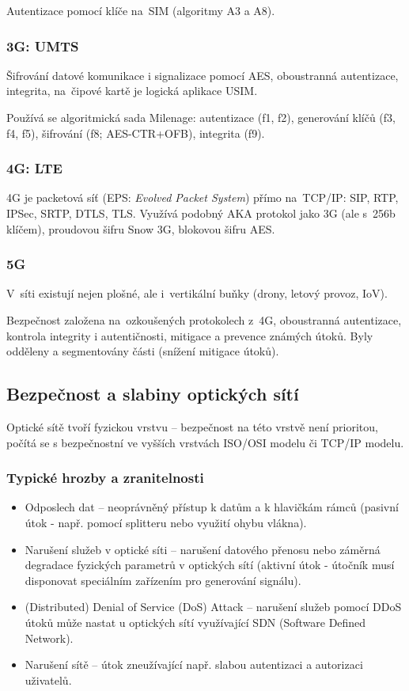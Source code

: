 Autentizace pomocí klíče na~SIM (algoritmy A3 a A8).


\subsubsection{3G: UMTS}

Šifrování datové komunikace i signalizace pomocí AES, oboustranná autentizace, integrita, na~čipové kartě je logická aplikace USIM.

Používá se algoritmická sada Milenage: autentizace (f1, f2), generování klíčů (f3, f4, f5), šifrování (f8; AES-CTR+OFB), integrita (f9).


\subsubsection{4G: LTE}

4G je packetová síť (EPS: \emph{Evolved Packet System}) přímo na~TCP/IP: SIP, RTP, IPSec, SRTP, DTLS, TLS.
Využívá podobný AKA protokol jako 3G (ale s~256b klíčem), proudovou šifru Snow 3G, blokovou šifru AES.


\subsubsection{5G}

V~síti existují nejen plošné, ale i~vertikální buňky (drony, letový provoz, IoV).

Bezpečnost založena na~ozkoušených protokolech z~4G, oboustranná autentizace, kontrola integrity i autentičnosti, mitigace a prevence známých útoků.
Byly odděleny a segmentovány části (snížení mitigace útoků).

\subsection{Bezpečnost a slabiny optických sítí}

Optické sítě tvoří fyzickou vrstvu – bezpečnost na této vrstvě není prioritou, počítá se s bezpečnostní ve vyšších vrstvách ISO/OSI modelu či TCP/IP modelu. 

\subsubsection{Typické hrozby a zranitelnosti}
\begin{itemize}
    \item Odposlech dat – neoprávněný přístup k datům a k hlavičkám rámců (pasivní útok - např. pomocí splitteru nebo využití ohybu vlákna).
    \item Narušení služeb v optické síti – narušení datového přenosu nebo záměrná degradace fyzických parametrů v optických sítí (aktivní útok - útočník musí disponovat speciálním zařízením pro generování signálu).
    \item (Distributed) Denial of Service (DoS) Attack – narušení služeb pomocí DDoS útoků může nastat u optických sítí využívající SDN (Software Defined Network).
    \item Narušení sítě – útok zneužívající např. slabou autentizaci a autorizaci uživatelů. 
\end{itemize}

